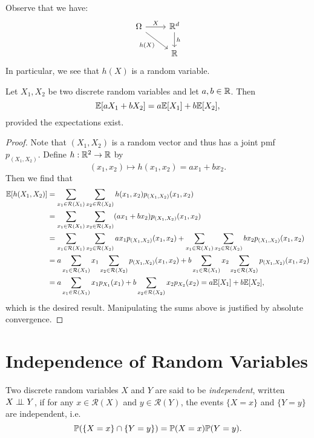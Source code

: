 \begin{remark}
  Observe that we have:
  \[
    \begin{tikzcd}
      \Omega \ar[r, "X"] \ar[dr, "h(X)", swap] & \R^d \ar[d, "h"] \\
      & \R
    \end{tikzcd}
  \]
  In particular, we see that $h(X)$ is a random
  variable.
\end{remark}

\begin{prop}
  Let $X_1, X_2$ be two discrete random variables and
  let $a, b \in \mathbb{R}$. Then
  \[
    \mathbb{E}[aX_1 + bX_2] = a\mathbb{E}[X_1] + b\mathbb{E}[X_2],
  \]
  provided the expectations exist.
\end{prop}

\begin{proof}
  Note that $(X_1, X_2)$ is a random vector and
  thus has a joint pmf $p_{(X_1, X_2)}$. Define $h : \mathbb{R}^2 \to \mathbb{R}$ by
  \[
    (x_1, x_2) \mapsto h(x_1, x_2) = ax_1 + bx_2.
  \]
  Then we find that
  \begin{align*}
    \mathbb{E}[h(X_1, X_2)]
    &= \sum_{x_1 \in \mathcal{R}(X_1)} \sum_{x_2 \in \mathcal{R}(X_2)} h(x_1, x_2) p_{(X_1, X_2)}(x_1, x_2) \\
    &= \sum_{x_1 \in \mathcal{R}(X_1)} \sum_{x_2 \in \mathcal{R}(X_2)} (ax_1 + bx_2) p_{(X_1, X_2)}(x_1, x_2) \\
    &= \sum_{x_1 \in \mathcal{R}(X_1)} \sum_{x_2 \in \mathcal{R}(X_2)} ax_1 p_{(X_1, X_2)}(x_1, x_2)
    + \sum_{x_1 \in \mathcal{R}(X_1)}
    \sum_{x_2 \in \mathcal{R}(X_2)} bx_2 p_{(X_1, X_2)}(x_1, x_2) \\
    &= a \sum_{x_1 \in \mathcal{R}(X_1)} x_1
    \sum_{x_2 \in \mathcal{R}(X_2)} p_{(X_1, X_2)}(x_1, x_2)
    + b \sum_{x_1 \in \mathcal{R}(X_1)} x_2
    \sum_{x_2 \in \mathcal{R}(X_2)} p_{(X_1, X_2)}(x_1, x_2) \\
    &= a \sum_{x_1 \in \mathcal{R}(X_1)} x_1 p_{X_1}(x_1)
    + b \sum_{x_2 \in \mathcal{R}(X_2)} x_2 p_{X_2}(x_2)
    = a \mathbb{E}[X_1] + b \mathbb{E}[X_2],
  \end{align*}
  which is the desired result.
  Manipulating the sums above is justified by
  absolute convergence.
\end{proof}

\section{Independence of Random Variables}

\begin{definition}
  Two discrete random variables $X$ and $Y$ are
  said to be \emph{independent}, written
  $X \perp\!\!\!\perp Y$, if for any $x \in \mathcal{R}(X)$
  and $y \in \mathcal{R}(Y)$, the events
  $\{X = x\}$ and $\{Y = y\}$ are independent, i.e.
  \[
    \mathbb{P}(\{X = x\} \cap \{Y = y\}) = \mathbb{P}(X = x) \mathbb{P}(Y = y).
  \]
\end{definition}


